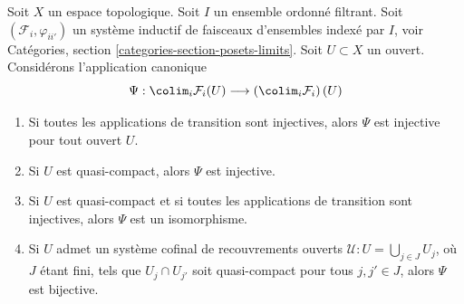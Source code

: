 \begin{lemma}
\label{lemma-directed-colimits-sections}
Soit $X$ un espace topologique. Soit $I$ un ensemble ordonné filtrant.
Soit $(\mathcal{F}_i, \varphi_{ii'})$ un système inductif de faisceaux d'ensembles
indexé par $I$, voir
Catégories, section \ref{categories-section-posets-limits}.
Soit $U \subset X$ un ouvert.
Considérons l'application canonique
$$
\Psi :
\colim_i \mathcal{F}_i(U)
\longrightarrow
\left(\colim_i \mathcal{F}_i\right)(U)
$$
\begin{enumerate}
\item Si toutes les applications de transition sont injectives, alors
$\Psi$ est injective pour tout ouvert $U$.
\item Si $U$ est quasi-compact, alors $\Psi$ est injective.
\item Si $U$ est quasi-compact et si toutes les applications de transition sont injectives,
alors $\Psi$ est un isomorphisme.
\item Si $U$ admet un système cofinal de recouvrements ouverts
$\mathcal{U} : U = \bigcup_{j\in J} U_j$, où
$J$ étant fini, tels que $U_j \cap U_{j'}$ soit quasi-compact
pour tous $j, j' \in J$, alors $\Psi$ est bijective.
\end{enumerate}
\end{lemma}


